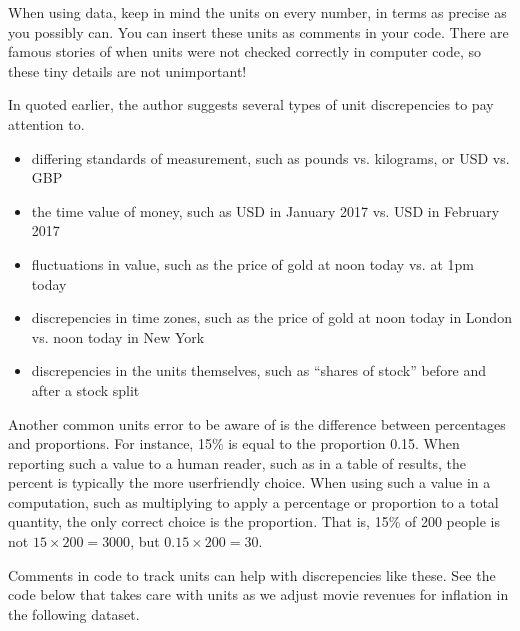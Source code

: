 \documentclass[letterpaper,10pt,english]{jupyterBook}
\begin{document}
\sphinxAtStartPar
When using data, keep in mind the units on every number, in terms as precise as you possibly can.  You can insert these units as comments in your code.  There are famous stories of  when units were not checked correctly in computer code, so these tiny details are not unimportant!

\sphinxAtStartPar
In  quoted earlier, the author suggests several types of unit discrepencies to pay attention to.
\begin{itemize}
\item {} 
\sphinxAtStartPar
differing standards of measurement, such as pounds vs. kilograms, or USD vs. GBP

\item {} 
\sphinxAtStartPar
the time value of money, such as USD in January 2017 vs. USD in February 2017

\item {} 
\sphinxAtStartPar
fluctuations in value, such as the price of gold at noon today vs. at 1pm today

\item {} 
\sphinxAtStartPar
discrepencies in time zones, such as the price of gold at noon today in London vs. noon today in New York

\item {} 
\sphinxAtStartPar
discrepencies in the units themselves, such as “shares of stock” before and after a stock split

\end{itemize}

\sphinxAtStartPar
Another common units error to be aware of is the difference between percentages and proportions.  For instance, 15\% is equal to the proportion 0.15.  When reporting such a value to a human reader, such as in a table of results, the percent is typically the more user\sphinxhyphen{}friendly choice.  When using such a value in a computation, such as multiplying to apply a percentage or proportion to a total quantity, the only correct choice is the proportion.  That is, 15\% of 200 people is not \(15\times200=3000\), but \(0.15\times200=30\).

\sphinxAtStartPar
Comments in code to track units can help with discrepencies like these.  See the code below that takes care with units as we adjust movie revenues for inflation in the following dataset.
\end{document}
